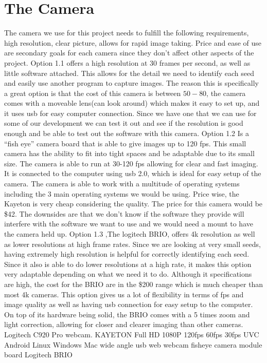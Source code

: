 \documentclass[10pt, letterpaper, twoside, draftclsnofoot, onecolumn. notitlepage]{article}
\begin{document}
\section{The Camera}
\quad
The camera we use for this project needs to fulfill the following requirements, high resolution, clear picture, allows for rapid image taking. Price and ease of use are secondary goals for each camera since they don't affect other aspects of the project.
Option 1.1 offers a high resolution at 30 frames per second, as well as little software attached. This allows for the detail we need to identify each seed and easily use another program to capture images. The reason this is specifically a great option is that the cost of this camera is between $50-$80, the camera comes with a moveable lens(can look around) which makes it easy to set up, and it uses usb for easy computer connection. Since we have one that we can use for some of our development we can test it out and see if the resolution is good enough and be able to test out the software with this camera. 
Option 1.2 Is a “fish eye” camera board that is able to give images up to 120 fps. This small camera has the ability to fit into tight spaces and be adaptable due to its small size. The camera is able to run at 30-120 fps allowing for clear and fast imaging. It is connected to the computer using usb 2.0, which is ideal for easy setup of the camera. The camera is able to work with a multitude of operating systems including the 3 main operating systems we would be using. Price wise, the Kayeton is very cheap considering the quality. The price for this camera would be \$42. The downsides are that we don’t know if the software they provide will interfere with the software we want to use and we would need a mount to have the camera held up.
Option 1.3 ,The logitech BRIO, offers 4k resolution as well as lower resolutions at high frame rates. Since we are looking at very small seeds, having extremely high resolution is helpful for correctly identifying each seed. Since it also is able to do lower resolutions at a high rate, it makes this option very adaptable depending on what we need it to do. Although it specifications are high, the cost for the BRIO are in the \$200 range which is much cheaper than most 4k cameras. This option gives us a lot of flexibility in terms of fps and image quality as well as having usb connection for easy setup to the computer. On top of its hardware being solid, the BRIO comes with a 5 times zoom and light correction, allowing for closer and clearer imaging than other cameras.  Logitech C920 Pro webcam.  KAYETON Full HD 1080P 120fps 60fps 30fps UVC Android Linux Windows Mac wide angle usb web webcam fisheye camera module board  Logitech BRIO \newline
\end{document}
